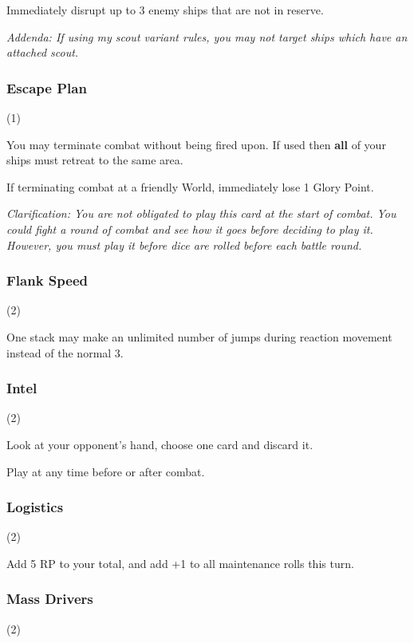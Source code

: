 
Immediately disrupt up to 3 enemy ships that are not in reserve.

\textit{Addenda: If using my scout variant rules, you may not target ships which have an attached scout.}

\subsubsection{Escape Plan} (1)


You may terminate combat without being fired upon. If used then \textbf{all} of your ships must retreat to the same area.

If terminating combat at a friendly World, immediately lose 1 Glory Point.

\textit{Clarification: You are not obligated to play this card at the start of combat. You could fight a round of combat and see how it goes before deciding to play it. However, you must play it before dice are rolled before each battle round.}

\subsubsection{Flank Speed} (2)


One stack may make an unlimited number of jumps during reaction movement instead of the normal 3.

\subsubsection{Intel} (2)


Look at your opponent's hand, choose one card and discard it.

Play at any time before or after combat.

\subsubsection{Logistics} (2)


Add 5 RP to your total, and add +1 to all maintenance rolls this turn.

\subsubsection{Mass Drivers} (2)

